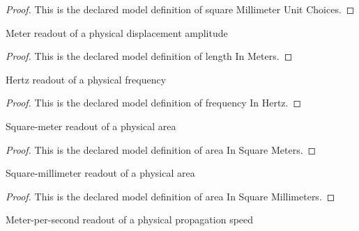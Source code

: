 \begin{proof}
  This is the declared model definition of square Millimeter Unit Choices.
\end{proof}
\begin{definition}
  \label{def:physics:phyx-mini-0189:phyxminiproblems-problemphyxmini0189-lengthinmeters}
  Meter readout of a physical displacement amplitude
\end{definition}
\begin{proof}
  This is the declared model definition of length In Meters.
\end{proof}
\begin{definition}
  \label{def:physics:phyx-mini-0189:phyxminiproblems-problemphyxmini0189-frequencyinhertz}
  Hertz readout of a physical frequency
\end{definition}
\begin{proof}
  This is the declared model definition of frequency In Hertz.
\end{proof}
\begin{definition}
  \label{def:physics:phyx-mini-0189:phyxminiproblems-problemphyxmini0189-areainsquaremeters}
  Square-meter readout of a physical area
\end{definition}
\begin{proof}
  This is the declared model definition of area In Square Meters.
\end{proof}
\begin{definition}
  \label{def:physics:phyx-mini-0189:phyxminiproblems-problemphyxmini0189-areainsquaremillimeters}
  Square-millimeter readout of a physical area
\end{definition}
\begin{proof}
  This is the declared model definition of area In Square Millimeters.
\end{proof}
\begin{definition}
  \label{def:physics:phyx-mini-0189:phyxminiproblems-problemphyxmini0189-speedinmeterspersecond}
  Meter-per-second readout of a physical propagation speed
\end{definition}
